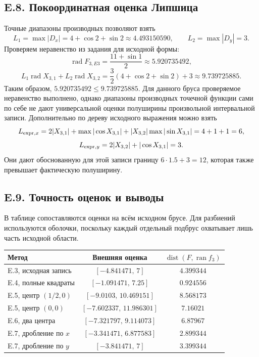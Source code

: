 \documentclass[12pt,a4paper]{article}
\newcommand{\ran}{\operatorname{ran}}
\newcommand{\rad}{\operatorname{rad}}
\newcommand{\dist}{\operatorname{dist}}
\begin{document}
\subsection*{E.8. Покоординатная оценка Липшица}
Точные диапазоны производных позволяют взять
\[
L_1=\max|D_x|=4+\cos2+\sin2\approx4.493150590,
\qquad L_2=\max|D_y|=3.
\]
Проверяем неравенство из задания для исходной формы:
\[
\rad F_{3,E3}=\frac{11+\sin1}{2}\approx5.920735492,
\]
\[
L_1\rad X_{3,1}+L_2\rad X_{3,2}
=\frac32(4+\cos2+\sin2)+3\approx9.739725885.
\]
Таким образом, $5.920735492\leq9.739725885$.
Для данного бруса проверяемое неравенство выполнено, однако диапазоны
производных точечной функции сами по себе не дают универсальной
оценки полуширины произвольной интервальной записи.
Дополнительно по дереву исходного выражения можно взять
\[
L_{{\rm expr},x}=2|X_{3,1}|+\max|\cos X_{3,1}|
+|X_{3,2}|\max|\sin X_{3,1}|=4+1+1=6,
\]
\[
L_{{\rm expr},y}=2|X_{3,2}|+|\cos X_{3,1}|=3.
\]
Они дают обоснованную для этой записи границу $6\cdot1.5+3=12$,
которая также превышает фактическую полуширину.

\subsection*{E.9. Точность оценок и выводы}
В таблице сопоставляются оценки на всём исходном брусе.
Для разбиений используются оболочки, поскольку каждый отдельный
подбрус охватывает лишь часть исходной области.

\begin{center}
{\small
\begin{tabular}{lcc}
\toprule
Метод & Внешняя оценка & $\dist(F,\ran f_3)$\\\midrule
E.3, исходная запись & $[-4.841471,\,7]$ & $4.399344$\\
E.4, полные квадраты & $[-1.091471,\,7.25]$ & $0.924556$\\
E.5, центр $(1/2,0)$ & $[-9.0103,\,10.469151]$ & $8.568173$\\
E.5, центр $(0,0)$ & $[-7.602337,\,11.986301]$ & $7.16021$\\
E.6, два центра & $[-7.321797,\,9.114073]$ & $6.87967$\\
E.7, дробление по $x$ & $[-3.341471,\,6.877583]$ & $2.899344$\\
E.7, дробление по $y$ & $[-3.841471,\,7]$ & $3.399344$\\
\bottomrule
\end{tabular}}
\end{center}
\end{document}
